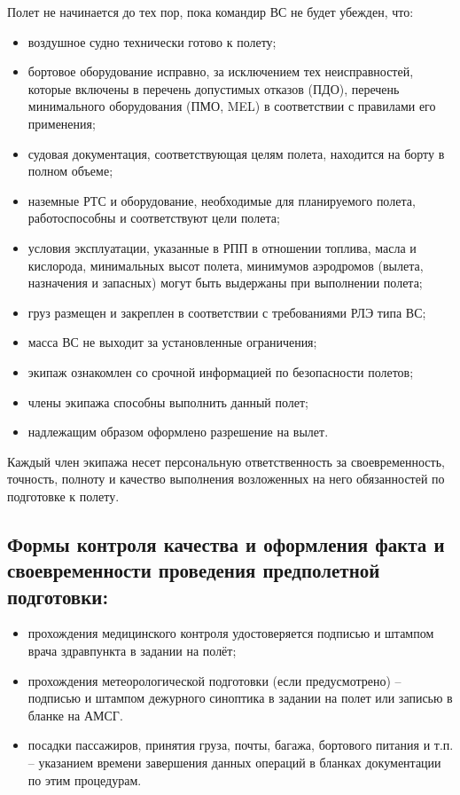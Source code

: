 Полет не начинается до тех пор, пока командир ВС не будет убежден, что:
\begin{itemize}
    \item 	воздушное судно технически готово к полету;
    \item 	бортовое оборудование исправно, за исключением тех неисправностей, которые включены в перечень допустимых отказов (ПДО), перечень минимального оборудования (ПМО, MEL) в соответствии с правилами его применения; 
    \item 	судовая документация, соответствующая целям полета, находится на борту в полном объеме;
    \item 	наземные РТС и оборудование, необходимые для планируемого полета, работоспособны и соответствуют цели полета;
    \item 	условия эксплуатации, указанные в РПП в отношении топлива, масла и кислорода, минимальных высот полета, минимумов аэродромов (вылета, назначения и запасных) могут быть выдержаны при выполнении полета;
    \item 	груз размещен и закреплен в соответствии с требованиями РЛЭ типа ВС;
    \item 	масса ВС не выходит за установленные ограничения;
    \item 	экипаж ознакомлен со срочной информацией по безопасности полетов;
    \item 	члены экипажа способны выполнить данный полет;
    \item 	надлежащим образом оформлено разрешение на вылет.
\end{itemize}

Каждый член экипажа несет персональную ответственность за своевременность, точность, полноту и качество выполнения возложенных на него обязанностей по подготовке к полету.

\subsection{Формы контроля качества и оформления факта и своевременности проведения предполетной подготовки:}
\begin{itemize}
    \item	прохождения медицинского контроля удостоверяется подписью и штампом врача здравпункта в задании на полёт;
    \item	прохождения метеорологической подготовки (если предусмотрено) – подписью и штампом дежурного синоптика в задании на полет или записью в бланке на АМСГ. 
    \item	посадки пассажиров, принятия груза, почты, багажа, бортового питания и т.п. – указанием времени завершения данных операций в бланках документации по этим процедурам.
\end{itemize}

